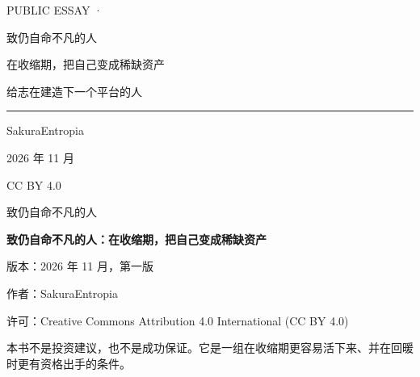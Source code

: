 \documentclass[11pt,openany,oneside]{ctexbook}
\begin{document}
\setlength{\parindent}{22pt}
\setlength{\parskip}{0pt}
\frontmatter

\begin{titlepage}
\thispagestyle{empty}
\centering
\vspace*{16mm}
{\heiti\fontsize{8.5}{11}\selectfont\color{muted} PUBLIC ESSAY \quad ·}

\vspace{34mm}
{\heiti\fontsize{29}{36}\selectfont\color{ink} 致仍自命不凡的人\par}
\vspace{5mm}
{\heiti\fontsize{14.5}{20}\selectfont\color{ink} 在收缩期，把自己变成稀缺资产\par}
\vspace{4mm}
{\songti\fontsize{11}{16}\selectfont\color{muted} 给志在建造下一个平台的人\par}

\vspace{16mm}
{\color{accent}\rule{0.42\textwidth}{1.1pt}}

\vfill
{\heiti\fontsize{11}{14}\selectfont SakuraEntropia\par}
\vspace{2mm}
{\songti\small\color{muted} 2026 年 11 月\par}
\vspace{8mm}
{\songti\footnotesize\color{muted} CC BY 4.0\par}
\end{titlepage}

\clearpage
\thispagestyle{empty}
\vspace*{58mm}
\begin{center}
{\heiti\fontsize{17}{22}\selectfont 致仍自命不凡的人}
\end{center}
\clearpage

\thispagestyle{empty}
\vspace*{\fill}
{\small\color{ink}
\textbf{致仍自命不凡的人：在收缩期，把自己变成稀缺资产}\par
\vspace{2mm}
版本：2026 年 11 月，第一版\par
作者：SakuraEntropia\par
许可：Creative Commons Attribution 4.0 International (CC BY 4.0)\par
\vspace{4mm}
本书不是投资建议，也不是成功保证。它是一组在收缩期更容易活下来、并在回暖时更有资格出手的条件。\par
}
\vspace*{\fill}
\end{document}
